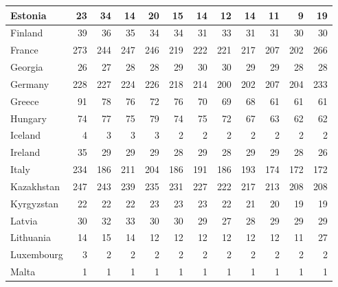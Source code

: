 \begin{table}
\begin{tabular}{|l|r|r|r|r|r|r|r|r|r|r|r|}
                       Estonia&     23&     34&     14&     20&     15&     14&     12&     14&     11&      9&     19\\\hline
                       Finland&     39&     36&     35&     34&     34&     31&     33&     31&     31&     30&     30\\\hline
                        France&    273&    244&    247&    246&    219&    222&    221&    217&    207&    202&    266\\\hline
                       Georgia&     26&     27&     28&     28&     29&     30&     30&     29&     29&     28&     28\\\hline
                       Germany&    228&    227&    224&    226&    218&    214&    200&    202&    207&    204&    233\\\hline
                        Greece&     91&     78&     76&     72&     76&     70&     69&     68&     61&     61&     61\\\hline
                       Hungary&     74&     77&     75&     79&     74&     75&     72&     67&     63&     62&     62\\\hline
                       Iceland&      4&      3&      3&      3&      2&      2&      2&      2&      2&      2&      2\\\hline
                       Ireland&     35&     29&     29&     29&     28&     29&     28&     29&     29&     28&     26\\\hline
                         Italy&    234&    186&    211&    204&    186&    191&    186&    193&    174&    172&    172\\\hline
                    Kazakhstan&    247&    243&    239&    235&    231&    227&    222&    217&    213&    208&    208\\\hline
                    Kyrgyzstan&     22&     22&     22&     23&     23&     23&     22&     21&     20&     19&     19\\\hline
                        Latvia&     30&     32&     33&     30&     30&     29&     27&     28&     29&     29&     29\\\hline
                     Lithuania&     14&     15&     14&     12&     12&     12&     12&     12&     12&     11&     27\\\hline
                    Luxembourg&      3&      2&      2&      2&      2&      2&      2&      2&      2&      2&      2\\\hline
                         Malta&      1&      1&      1&      1&      1&      1&      1&      1&      1&      1&      1\\\hline

\end{tabular}
\end{table}
